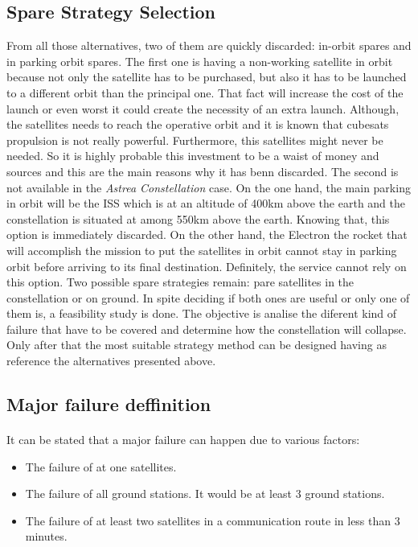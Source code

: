 \subsection{Spare Strategy Selection}
From all those alternatives, two of them  are quickly discarded: in-orbit spares and in parking orbit spares. The first one is having a non-working satellite in orbit because not only the satellite has to be purchased, but also it has to be launched to a different orbit than the principal one. That fact will increase the cost of the launch or even worst it could create the necessity of an extra launch. Although, the satellites needs to reach the operative orbit and it is known that cubesats propulsion is not really powerful. Furthermore, this satellites might never be needed. So it is highly probable this investment to be a waist of money and sources and this are the main reasons why it has benn discarded.
\newline
\newline
The second is not available in the \textit{Astrea Constellation} case. On the one hand, the main parking in orbit will be the ISS which is at an altitude of 400km above the earth and the constellation is situated at among 550km above the earth. Knowing that, this option is immediately discarded. On the other hand, the Electron the rocket that will accomplish the mission to put the satellites in orbit cannot stay in parking orbit before arriving to its final destination. Definitely, the service cannot rely on this option.
\newline
\newline
Two possible spare strategies remain: pare satellites in the constellation or on ground. In spite deciding if both ones are useful or only one of them is, a feasibility study is done. The objective is analise the diferent kind of failure that have to be covered and determine how the constellation will collapse. Only after that the most suitable strategy method can be designed having as reference the alternatives presented above. 
\subsection{Major failure deffinition}

\paragraph{}It can be stated that a major failure can happen due to various factors:
\begin{itemize}
\item The failure of at one satellites.
\item The failure of all ground stations. It would be at least 3 ground stations.
\item The failure of at least two satellites in a communication route in less than 3 minutes.
\end{itemize}


